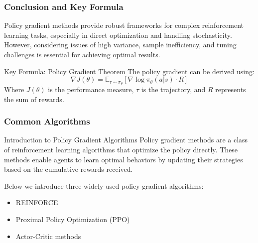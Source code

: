 \documentclass{beamer}
\begin{document}
\begin{frame}[fragile]
    \frametitle{Conclusion and Key Formula}
    Policy gradient methods provide robust frameworks for complex reinforcement learning tasks, especially in direct optimization and handling stochasticity. However, considering issues of high variance, sample inefficiency, and tuning challenges is essential for achieving optimal results.

    \begin{block}{Key Formula: Policy Gradient Theorem}
        The policy gradient can be derived using:
        \begin{equation}
        \nabla J(\theta) = \mathbb{E}_{\tau \sim \pi_\theta} \left[ \nabla \log \pi_\theta(a|s) \cdot R \right]
        \end{equation}
        Where \(J(\theta)\) is the performance measure, \(\tau\) is the trajectory, and \(R\) represents the sum of rewards.
    \end{block}
\end{frame}

\begin{frame}[fragile]
    \frametitle{Common Algorithms}
    
    \begin{block}{Introduction to Policy Gradient Algorithms}
    Policy gradient methods are a class of reinforcement learning algorithms that optimize the policy directly. These methods enable agents to learn optimal behaviors by updating their strategies based on the cumulative rewards received.
    \end{block}
    
    Below we introduce three widely-used policy gradient algorithms:
    \begin{itemize}
        \item REINFORCE
        \item Proximal Policy Optimization (PPO)
        \item Actor-Critic methods
    \end{itemize}
\end{frame}
\end{document}
